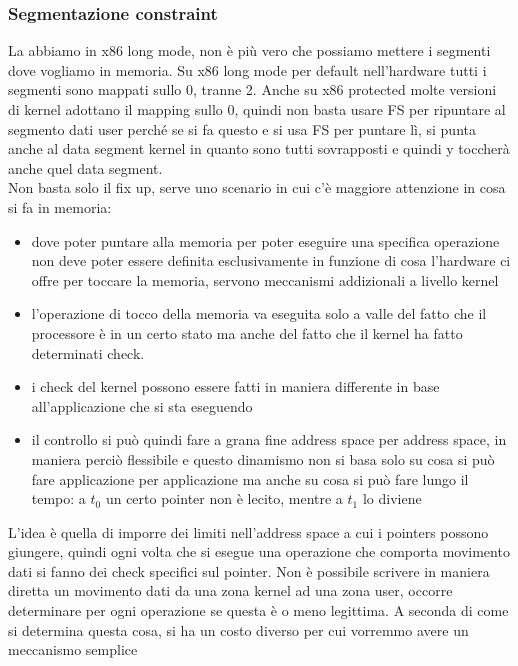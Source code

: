 \documentclass[12pt, oneside]{extbook}
\begin{document}
\subsubsection{Segmentazione constraint}
La abbiamo in x86 long mode, non è più vero che possiamo mettere i segmenti dove vogliamo in memoria. Su x86 long mode per default nell'hardware tutti i segmenti sono mappati sullo 0, tranne 2. Anche su x86 protected molte versioni di kernel adottano il mapping sullo 0, quindi non basta usare FS per ripuntare al segmento dati user perché se si fa questo e si usa FS per puntare lì, si punta anche al data segment kernel in quanto sono tutti sovrapposti e quindi y toccherà anche quel data segment.\\Non basta solo il fix up, serve uno scenario in cui c'è maggiore attenzione in cosa si fa in memoria:
\begin{itemize}
\item dove poter puntare alla memoria per poter eseguire una specifica operazione non deve poter essere definita esclusivamente in funzione di cosa l'hardware ci offre per toccare la memoria, servono meccanismi addizionali a livello kernel
\item l'operazione di tocco della memoria va eseguita solo a valle del fatto che il processore è in un certo stato ma anche del fatto che il kernel ha fatto determinati check.
\item i check del kernel possono essere fatti in maniera differente in base all'applicazione che si sta eseguendo
\item il controllo si può quindi fare a grana fine address space per address space, in maniera perciò flessibile e questo dinamismo non si basa solo su cosa si può fare applicazione per applicazione ma anche su cosa si può fare lungo il tempo: a $t_0$ un certo pointer non è lecito, mentre a $t_1$ lo diviene
\end{itemize}
L'idea è quella di imporre dei limiti nell'address space a cui i pointers possono giungere, quindi ogni volta che si esegue una operazione che comporta movimento dati si fanno dei check specifici sul pointer. Non è possibile scrivere in maniera diretta un movimento dati da una zona kernel ad una zona user, occorre determinare per ogni operazione se questa è o meno legittima. A seconda di come si determina questa cosa, si ha un costo diverso per cui vorremmo avere un meccanismo semplice
\end{document}
